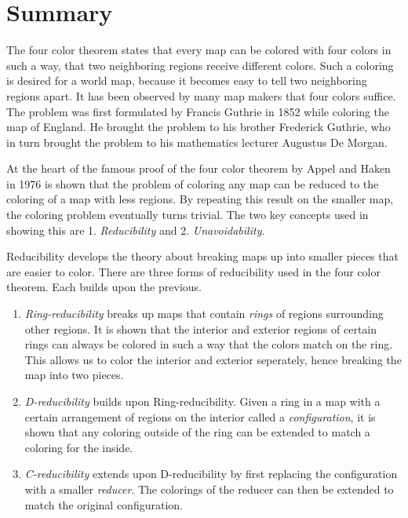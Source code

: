 \section*{Summary}
\label{sec:summary}

The four color theorem states that every map can be colored with four colors in such a way, that two neighboring regions receive different colors. Such a coloring is desired for a world map, because it becomes easy to tell two neighboring regions apart. It has been observed by many map makers that four colors suffice. The problem was first formulated by Francis Guthrie in 1852 while coloring the map of England. He brought the problem to his brother Frederick Guthrie, who in turn brought the problem to his mathematics lecturer Augustus De Morgan. 

At the heart of the famous proof of the four color theorem by Appel and Haken in 1976 \cite{appel} is shown that the problem of coloring any map can be reduced to the coloring of a map with less regions. By repeating this result on the smaller map, the coloring problem eventually turns trivial. The two key concepts used in showing this are 1. \textit{Reducibility} and 2. \textit{Unavoidability}. 

Reducibility develops the theory about breaking maps up into smaller pieces that are easier to color. There are three forms of reducibility used in the four color theorem. Each builds upon the previous.

\begin{enumerate}
\item \textit{Ring-reducibility} breaks up maps that contain \textit{rings} of regions surrounding other regions. It is shown that the interior and exterior regions of certain rings can always be colored in such a way that the colors match on the ring. This allows us to color the interior and exterior seperately, hence breaking the map into two pieces. 

\item \textit{D-reducibility} builds upon Ring-reducibility. Given a ring in a map with a certain arrangement of regions on the interior called a \textit{configuration}, it is shown that any coloring outside of the ring can be extended to match a coloring for the inside. 

\item \textit{C-reducibility} extends upon D-reducibility by first replacing the configuration with a smaller \textit{reducer}. The colorings of the reducer can then be extended to match the original configuration.
\end{enumerate}

